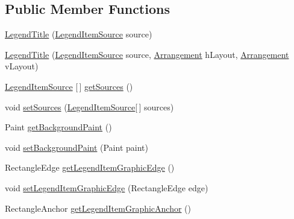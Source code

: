 \subsection*{Public Member Functions}
\begin{DoxyCompactItemize}
\item 
\mbox{\hyperlink{classorg_1_1jfree_1_1chart_1_1title_1_1_legend_title_a1c5840bec8d17c4452de970aec4acef5}{Legend\+Title}} (\mbox{\hyperlink{interfaceorg_1_1jfree_1_1chart_1_1_legend_item_source}{Legend\+Item\+Source}} source)
\item 
\mbox{\hyperlink{classorg_1_1jfree_1_1chart_1_1title_1_1_legend_title_a4e7c93286bbce41c2bb9627b4675460a}{Legend\+Title}} (\mbox{\hyperlink{interfaceorg_1_1jfree_1_1chart_1_1_legend_item_source}{Legend\+Item\+Source}} source, \mbox{\hyperlink{interfaceorg_1_1jfree_1_1chart_1_1block_1_1_arrangement}{Arrangement}} h\+Layout, \mbox{\hyperlink{interfaceorg_1_1jfree_1_1chart_1_1block_1_1_arrangement}{Arrangement}} v\+Layout)
\item 
\mbox{\hyperlink{interfaceorg_1_1jfree_1_1chart_1_1_legend_item_source}{Legend\+Item\+Source}} \mbox{[}$\,$\mbox{]} \mbox{\hyperlink{classorg_1_1jfree_1_1chart_1_1title_1_1_legend_title_a2703d7646e4fbb23ae3ce2e57b74498c}{get\+Sources}} ()
\item 
void \mbox{\hyperlink{classorg_1_1jfree_1_1chart_1_1title_1_1_legend_title_a72eff4f5d39baf4619009ce06bfaa860}{set\+Sources}} (\mbox{\hyperlink{interfaceorg_1_1jfree_1_1chart_1_1_legend_item_source}{Legend\+Item\+Source}}\mbox{[}$\,$\mbox{]} sources)
\item 
Paint \mbox{\hyperlink{classorg_1_1jfree_1_1chart_1_1title_1_1_legend_title_a21085fa0d5385b9984bb4f96019c253a}{get\+Background\+Paint}} ()
\item 
void \mbox{\hyperlink{classorg_1_1jfree_1_1chart_1_1title_1_1_legend_title_a0f9b542e92438cebe2c7fe107ef957f6}{set\+Background\+Paint}} (Paint paint)
\item 
Rectangle\+Edge \mbox{\hyperlink{classorg_1_1jfree_1_1chart_1_1title_1_1_legend_title_a2dc5bfb58c55eec1e4efaa6631c05ab6}{get\+Legend\+Item\+Graphic\+Edge}} ()
\item 
void \mbox{\hyperlink{classorg_1_1jfree_1_1chart_1_1title_1_1_legend_title_a7857414686eba0866193cef92f82cfc5}{set\+Legend\+Item\+Graphic\+Edge}} (Rectangle\+Edge edge)
\item 
Rectangle\+Anchor \mbox{\hyperlink{classorg_1_1jfree_1_1chart_1_1title_1_1_legend_title_add9d744313735efc2ab5dc7628c17a68}{get\+Legend\+Item\+Graphic\+Anchor}} ()

\end{DoxyCompactItemize}
